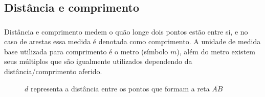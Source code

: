 \documentclass[handout]{beamer}
\begin{document}
\subsection{Distância e comprimento}
\begin{frame}\frametitle{\subsecname}
    Distância e comprimento medem o quão longe dois pontos estão entre si, e no caso de arestas essa medida é
    denotada como comprimento. A unidade de medida base utilizada para comprimento é o metro (símbolo ${m}$), além do
    metro existem seus múltiplos que são igualmente utilizados dependendo da distância/comprimento aferido.

    \begin{figure}[H]
        \centering
        \caption{$d$ representa a distância entre os pontos que formam a reta $\overline{AB}$}
    \end{figure}

\end{frame}


\begin{frame}\frametitle{\subsecname}
    \begin{table}[H]
    \end{table}
\end{frame}
\end{document}
